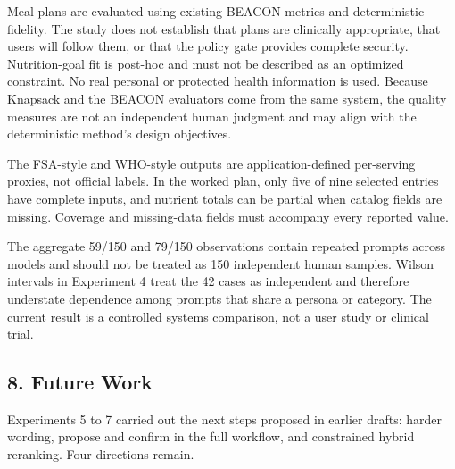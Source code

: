 \documentclass[
  10pt,
  letterpaper,
]{article}
\begin{document}
Meal plans are evaluated using existing BEACON metrics and deterministic
fidelity. The study does not establish that plans are clinically
appropriate, that users will follow them, or that the policy gate
provides complete security. Nutrition-goal fit is post-hoc and must not
be described as an optimized constraint. No real personal or protected
health information is used. Because Knapsack and the BEACON evaluators
come from the same system, the quality measures are not an independent
human judgment and may align with the deterministic method's design
objectives.

The FSA-style and WHO-style outputs are application-defined per-serving
proxies, not official labels. In the worked plan, only five of nine
selected entries have complete inputs, and nutrient totals can be
partial when catalog fields are missing. Coverage and missing-data
fields must accompany every reported value.

The aggregate 59/150 and 79/150 observations contain repeated prompts
across models and should not be treated as 150 independent human
samples. Wilson intervals in Experiment 4 treat the 42 cases as
independent and therefore understate dependence among prompts that share
a persona or category. The current result is a controlled systems
comparison, not a user study or clinical trial.

\subsection{8. Future Work}\label{future-work}

Experiments 5 to 7 carried out the next steps proposed in earlier
drafts: harder wording, propose and confirm in the full workflow, and
constrained hybrid reranking. Four directions remain.
\end{document}
